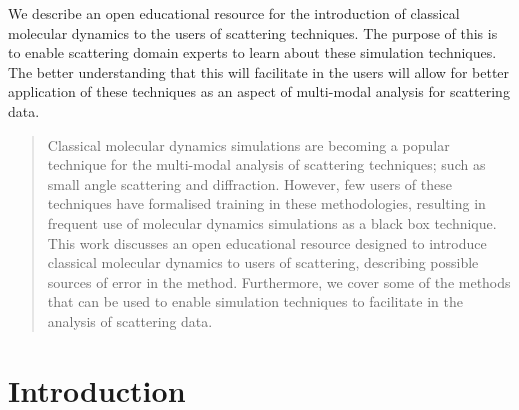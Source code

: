 \documentclass[pdf]{iucr}              %
\begin{document}

\maketitle                        %

\begin{synopsis}
We describe an open educational resource for the introduction of classical molecular dynamics to the users of scattering techniques.
The purpose of this is to enable scattering domain experts to learn about these simulation techniques.
The better understanding that this will facilitate in the users will allow for better application of these techniques as an aspect of multi-modal analysis for scattering data. 
\end{synopsis}

\begin{abstract}
Classical molecular dynamics simulations are becoming a popular technique for the multi-modal analysis of scattering techniques; such as small angle scattering and diffraction.
However, few users of these techniques have formalised training in these methodologies, resulting in frequent use of molecular dynamics simulations as a black box technique.
This work discusses an open educational resource designed to introduce classical molecular dynamics to users of scattering, describing possible sources of error in the method.
Furthermore, we cover some of the methods that can be used to enable simulation techniques to facilitate in the analysis of scattering data.
\end{abstract}



\section{Introduction}
\end{document}
